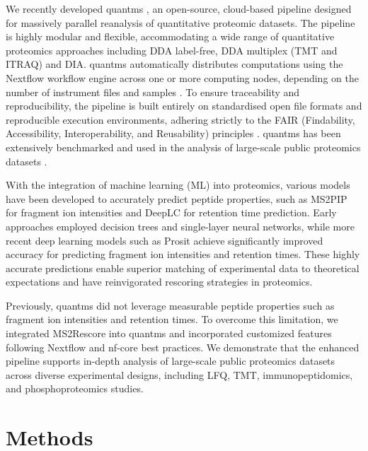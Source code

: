 \documentclass[12pt]{article}
\begin{document}
We recently developed quantms \cite{dai_quantms_2024}, an open-source, cloud-based pipeline designed for massively parallel reanalysis of quantitative proteomic datasets. The pipeline is highly modular and flexible, accommodating a wide range of quantitative proteomics approaches including DDA label-free, DDA multiplex (TMT and ITRAQ) and DIA. quantms automatically distributes computations using the Nextflow workflow engine across one or more computing nodes, depending on the number of instrument files and samples \cite{di_tommaso_nextflow_2017}. To ensure traceability and reproducibility, the pipeline is built entirely on standardised open file formats and reproducible execution environments, adhering strictly to the FAIR (Findability, Accessibility, Interoperability, and Reusability) principles \cite{wilkinson_fair_2016}. quantms has been extensively benchmarked and used in the analysis of large-scale public proteomics datasets \cite{dai_quantms_2024,bai2023lfq, ZHENG2025105440}.

With the integration of machine learning (ML) into proteomics, various models have been developed to accurately predict peptide properties, such as MS2PIP \cite{degroeve_ms2pip_2013} for fragment ion intensities and DeepLC \cite{bouwmeester_deeplc_2021} for retention time prediction. Early approaches employed decision trees and single-layer neural networks, while more recent deep learning models such as Prosit \cite{gessulat_prosit_2019} achieve significantly improved accuracy for predicting fragment ion intensities and retention times. These highly accurate predictions enable superior matching of experimental data to theoretical expectations and have reinvigorated rescoring strategies in proteomics.

Previously, quantms did not leverage measurable peptide properties such as fragment ion intensities and retention times. To overcome this limitation, we integrated MS2Rescore into quantms and incorporated customized features following Nextflow and nf-core best practices. We demonstrate that the enhanced pipeline supports in-depth analysis of large-scale public proteomics datasets across diverse experimental designs, including LFQ, TMT, immunopeptidomics, and phosphoproteomics studies.

\section{Methods}
\end{document}
